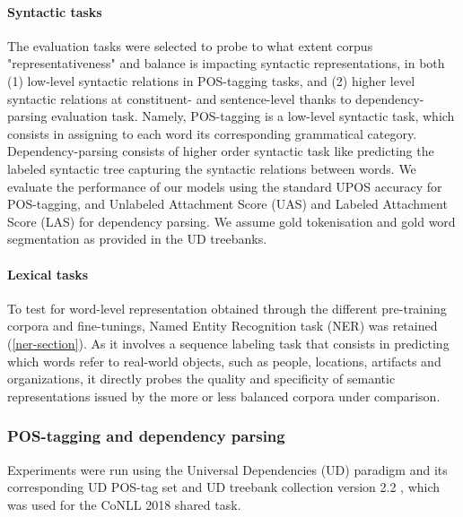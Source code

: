 \paragraph{Syntactic tasks}
The evaluation tasks were selected to probe to what extent corpus "representativeness" and balance is impacting syntactic representations, in both (1) low-level syntactic relations in POS-tagging tasks, and (2) higher level syntactic relations at constituent- and sentence-level thanks to dependency-parsing evaluation task. Namely, POS-tagging is a low-level syntactic task, which consists in assigning to each word its corresponding grammatical category. Dependency-parsing consists of higher order syntactic task like predicting the labeled syntactic tree capturing the syntactic relations between words.
We evaluate the performance of our models using the standard UPOS accuracy for POS-tagging, and Unlabeled Attachment Score (UAS) and Labeled Attachment Score (LAS) for dependency parsing. We assume gold tokenisation and gold word segmentation as provided in the UD treebanks.

\paragraph{Lexical tasks}
To test for word-level representation obtained through the different pre-training corpora and fine-tunings, Named Entity Recognition task (NER) was retained (\ref{ner-section}). As it involves a sequence labeling task that consists in predicting which words refer to real-world objects, such as people, locations, artifacts and organizations, it directly probes the quality and specificity of semantic representations issued by the more or less balanced corpora under comparison.



\subsubsection{POS-tagging and dependency parsing}


Experiments were run using the Universal Dependencies (UD) paradigm and its corresponding UD POS-tag set \citep{petrov-etal-2012-universal} and UD treebank collection version 2.2 \citep{nivre-etal-2018-universal}, which was used for the CoNLL 2018 shared task.

